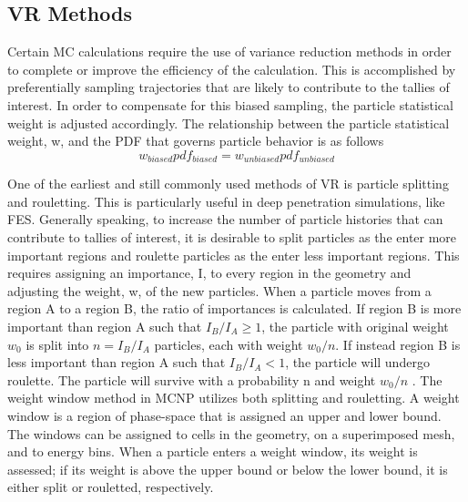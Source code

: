 \subsection{VR Methods}

Certain MC calculations require the use of variance reduction methods in order
to complete or improve the efficiency of the calculation. 
This is accomplished
by preferentially sampling trajectories that are likely to contribute to the tallies of
interest.
In order to compensate for this biased sampling, the particle statistical weight
is adjusted accordingly.
The relationship between the particle statistical weight, w, and the PDF that
governs particle behavior is as follows
\begin{equation} \label{eq:1}
		w_{biased} pdf_{biased} = w_{unbiased} pdf_{unbiased}
\end{equation}

One of the earliest and still commonly used methods of VR is particle splitting
and rouletting.  This is particularly useful in deep penetration simulations,
like FES.  Generally speaking, to increase the number of particle
histories that can contribute to tallies of interest, it is desirable to split
particles as the enter more important regions and roulette particles as the
enter less important regions. 
This requires assigning an importance, I, to every
region in the geometry and adjusting the weight, w, of the new particles. 
When a particle moves from a region A to a region B,
the ratio of importances is calculated.  If region B is more important than
region A such that 
$I_{B}/I_{A} \geqslant 1$, 
the particle with original weight $w_{0}$ is split into 
$n = I_{B}/I_{A}$
particles, each with weight $w_{0}/n$.  If instead region B is less important
than
region A such that
$I_{B}/I_{A} < 1$, 
the particle will undergo roulette. 
The particle will survive with a probability n and weight $w_{0}/n$
\cite{Carter_Cashwell_1975}.
The weight window method in MCNP utilizes both splitting and
rouletting.  A weight window is a region of phase-space that is assigned an upper and
lower bound.  The windows can be assigned to cells in the geometry, on a
superimposed mesh, and to energy bins.  When a particle enters a weight window, its weight is assessed; if
its weight is above the upper bound or below the lower bound, it is either split
or rouletted, respectively.

